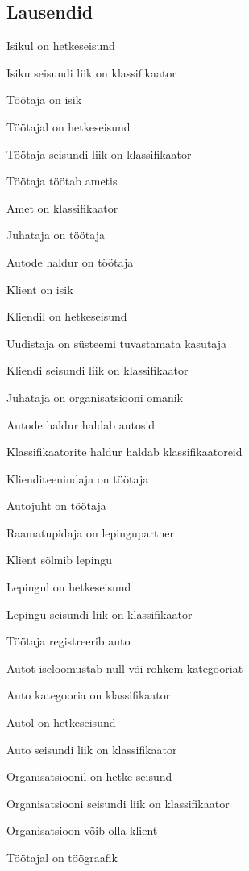\subsection{Lausendid}
\begin{myitemize}
	\item Isikul on hetkeseisund
	\item Isiku seisundi liik on klassifikaator
	\item Töötaja on isik
	\item Töötajal on hetkeseisund
	\item Töötaja seisundi liik on klassifikaator
	\item Töötaja töötab ametis
	\item Amet on klassifikaator
	\item Juhataja on töötaja
	\item Autode haldur on töötaja
	\item Klient on isik
	\item Kliendil on hetkeseisund
	\item Uudistaja on süsteemi tuvastamata kasutaja
	\item Kliendi seisundi liik on klassifikaator
	\item Juhataja on organisatsiooni omanik
	\item Autode haldur haldab autosid
	\item Klassifikaatorite haldur haldab klassifikaatoreid
	\item Klienditeenindaja on töötaja
	\item Autojuht on töötaja
	\item Raamatupidaja on lepingupartner
	\item Klient sõlmib lepingu
	\item Lepingul on hetkeseisund
	\item Lepingu seisundi liik on klassifikaator
	\item Töötaja registreerib auto
	\item Autot iseloomustab null või rohkem kategooriat
	\item Auto kategooria on klassifikaator
	\item Autol on hetkeseisund
	\item Auto seisundi liik on klassifikaator
	\item Organisatsioonil on hetke seisund
	\item Organisatsiooni seisundi liik on klassifikaator
	\item Organisatsioon võib olla klient
	\item Töötajal on töögraafik

\end{myitemize}
